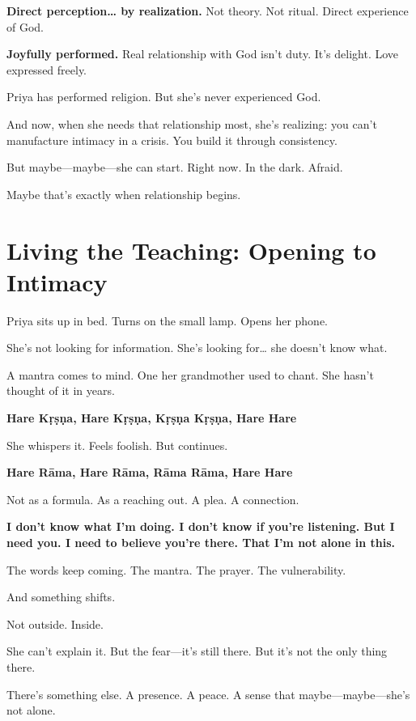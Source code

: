 \documentclass[11pt,twoside]{book}
\begin{document}
\textbf{\textbf{Direct perception\ldots{} by realization.}} Not theory. Not ritual. Direct experience of God.

\textbf{\textbf{Joyfully performed.}} Real relationship with God isn't duty. It's delight. Love expressed freely.

Priya has performed religion. But she's never experienced God.

And now, when she needs that relationship most, she's realizing: you can't manufacture intimacy in a crisis. You build it through consistency.

But maybe—maybe—she can start. Right now. In the dark. Afraid.

Maybe that's exactly when relationship begins.

\section*{Living the Teaching: Opening to Intimacy}

Priya sits up in bed. Turns on the small lamp. Opens her phone.

She's not looking for information. She's looking for\ldots{} she doesn't know what.

A mantra comes to mind. One her grandmother used to chant. She hasn't thought of it in years.

\textbf{Hare Kṛṣṇa, Hare Kṛṣṇa, Kṛṣṇa Kṛṣṇa, Hare Hare}

She whispers it. Feels foolish. But continues.

\textbf{Hare Rāma, Hare Rāma, Rāma Rāma, Hare Hare}

Not as a formula. As a reaching out. A plea. A connection.

\textbf{I don't know what I'm doing. I don't know if you're listening. But I need you. I need to believe you're there. That I'm not alone in this.}

The words keep coming. The mantra. The prayer. The vulnerability.

And something shifts.

Not outside. Inside.

She can't explain it. But the fear—it's still there. But it's not the only thing there.

There's something else. A presence. A peace. A sense that maybe—maybe—she's not alone.
\end{document}
